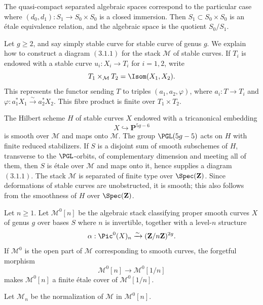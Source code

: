 The quasi-compact separated algebraic spaces correspond to the particular case where $(d_0,d_1):S_1\to S_0\times S_0$ is a closed immersion. Then $S_1\subset S_0\times S_0$ is an étale equivalence relation, and the algebraic space is the quotient $S_0/S_1$.

Let $g\ge2$, and say simply stable curve for stable curve of genus $g$. We explain how to construct a diagram \((3.1.1)\) for the stack $\mathcal M$ of stable curves. If $T_i$ is endowed with a stable curve $u_i:X_i\to T_i$ for $i=1,2$, write
\[
  T_1\times_{\mathcal M}T_2=\Isom(X_1,X_2).
\]
This represents the functor sending $T$ to triples $(a_1,a_2,\varphi)$, where $a_i:T\to T_i$ and $\varphi:a_1^*X_1\xrightarrow{\sim}a_2^*X_2$. This fibre product is finite over $T_1\times T_2$.

The Hilbert scheme $H$ of stable curves $X$ endowed with a tricanonical embedding
\[
  X\hookrightarrow \mathbf P^{5g-6}
\]
is smooth over $\mathcal M$ and maps onto $\mathcal M$. The group $\PGL(5g-5)$ acts on $H$ with finite reduced stabilizers. If $S$ is a disjoint sum of smooth subschemes of $H$, transverse to the $\PGL$-orbits, of complementary dimension and meeting all of them, then $S$ is étale over $\mathcal M$ and maps onto it, hence supplies a diagram \((3.1.1)\). The stack $\mathcal M$ is separated of finite type over $\Spec(\mathbf Z)$. Since deformations of stable curves are unobstructed, it is smooth; this also follows from the smoothness of $H$ over $\Spec(\mathbf Z)$.

Let $n\ge1$. Let $\mathcal M^0[n]$ be the algebraic stack classifying proper smooth curves $X$ of genus $g$ over bases $S$ where $n$ is invertible, together with a level-$n$ structure
\[
  \alpha:\Pic^0(X)_n\xrightarrow{\sim}(\mathbf Z/n\mathbf Z)^{2g}.
\]
If $\mathcal M^0$ is the open part of $\mathcal M$ corresponding to smooth curves, the forgetful morphism
\[
  \mathcal M^0[n]\longrightarrow \mathcal M^0[1/n]
\]
makes $\mathcal M^0[n]$ a finite étale cover of $\mathcal M^0[1/n]$.

\begin{definition}
Let $\mathcal M_n$ be the normalization of $\mathcal M$ in $\mathcal M^0[n]$.
\end{definition}

